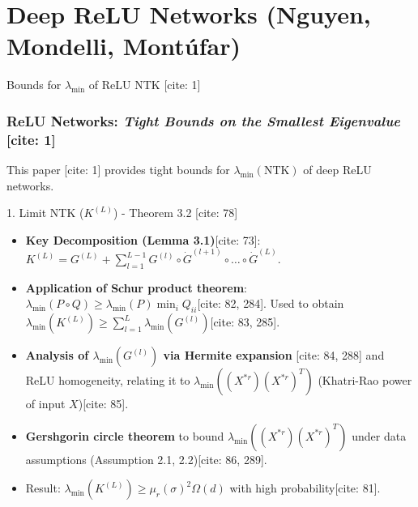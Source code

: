 \documentclass{beamer}
\theoremstyle{definition}
\theoremstyle{remark}
\newcommand{\lambdaMin}{\lambda_{\min}}
\newcommand{\OmegaNotation}{\Omega} %
\begin{document}
\section{Deep ReLU Networks (Nguyen, Mondelli, Montúfar)}
\begin{frame}{Bounds for $\lambdaMin$ of ReLU NTK [cite: 1]}
  \frametitle{ReLU Networks: \textit{Tight Bounds on the Smallest Eigenvalue} [cite: 1]}
  \justify
  This paper [cite: 1] provides tight bounds for $\lambdaMin(\text{NTK})$ of deep ReLU networks.

  \begin{block}{1. Limit NTK ($K^{(L)}$) - Theorem 3.2 [cite: 78]}
    \begin{itemize}
      \item \textbf{Key Decomposition (Lemma 3.1)}[cite: 73]: $K^{(L)} = G^{(L)} + \sum_{l=1}^{L-1} G^{(l)} \circ \dot{G}^{(l+1)} \circ \dots \circ \dot{G}^{(L)}$.
      \item \textbf{Application of Schur product theorem}: $\lambdaMin(P \circ Q) \ge \lambdaMin(P) \min_i Q_{ii}$[cite: 82, 284]. Used to obtain $\lambdaMin(K^{(L)}) \ge \sum_{l=1}^{L} \lambdaMin(G^{(l)})$[cite: 83, 285].
      \item \textbf{Analysis of $\lambdaMin(G^{(l)})$ via Hermite expansion} [cite: 84, 288] and ReLU homogeneity, relating it to $\lambdaMin((X^{\ast r})(X^{\ast r})^T)$ (Khatri-Rao power of input $X$)[cite: 85].
      \item \textbf{Gershgorin circle theorem} to bound $\lambdaMin((X^{\ast r})(X^{\ast r})^T)$ under data assumptions (Assumption 2.1, 2.2)[cite: 86, 289].
      \item Result: $\lambdaMin(K^{(L)}) \ge \mu_r(\sigma)^2 \OmegaNotation(d)$ with high probability[cite: 81].
    \end{itemize}
  \end{block}
\end{frame}
\end{document}
